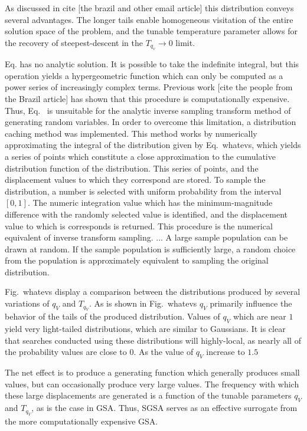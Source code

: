 \documentclass[11pt]{afthesis}
\begin{document}
	As discussed in cite [the brazil and other email article] this distribution conveys several advantages. The longer tails enable homogeneous visitation of the entire solution space of the problem, and the tunable temperature parameter allows for the recovery of steepest-descent in the $T_{q_v} \rightarrow 0$ limit. 
	
	Eq.{} has no analytic solution. It is possible to take the indefinite integral, but this operation yields a hypergeometric function which can only be computed as a power series of increasingly complex terms. Previous work [cite the people from the Brazil article] has shown that this procedure is computationally expensive. Thus, Eq.~{} is unsuitable for the analytic inverse sampling transform method of generating random variables. In order to overcome this limitation, a distribution caching method was implemented. This method works by numerically approximating the integral of the distribution given by Eq.~whatevs, which yields a series of points which constitute a close approximation to the cumulative distribution function of the distribution. This series of points, and the displacement values to which they correspond are stored. To sample the distribution, a number is selected with uniform probability from the interval $[0,1]$. The numeric integration value which has the minimum-magnitude difference with the randomly selected value is identified, and the displacement value to which is corresponds is returned. This procedure is the numerical equivalent of inverse transform sampling. ... A large sample population can be drawn at random. If the sample population is sufficiently large, a random choice from the population is approximately equivalent to sampling the original distribution. 
	
	Fig.~whatevs display a comparison between the distributions produced by several variations of $q_V$ and $T_{q_V}$. As is shown in Fig.~whatevs $q_V$ primarily influence the behavior of the tails of the produced distribution. Values of $q_V$ which are near $1$ yield very light-tailed distributions, which are similar to Gaussians. It is clear that searches conducted using these distributions will highly-local, as nearly all of the probability values are close to $0$. As the value of $q_V$ increase to $1.5$ 
	
	The net effect is to produce a generating function which generally produces small values, but can occasionally produce very large values. The frequency with which these large displacements are generated is a function of the tunable parameters $q_V$ and $T_{q_V}$, as is the case in GSA. Thus, SGSA serves as an effective surrogate from the more computationally expensive GSA. 
	
\end{document}
